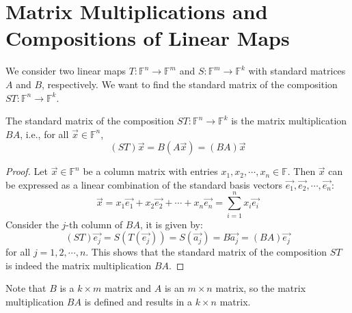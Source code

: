 \documentclass[
	11pt, %
	fleqn, %
	a4paper, %
]{LegrandOrangeBook}
\newcommand{\F}{\mathbb{F}} %
\begin{document}
\newpage

\section{Matrix Multiplications and Compositions of Linear Maps}

We consider two linear maps $T: \F^n \to \F^m$ and $S: \F^m \to \F^k$ with standard matrices $A$ and $B$, respectively. We want to find the standard matrix of the composition $ST: \F^n \to \F^k$.

\begin{center}
\end{center}

\begin{proposition}
    The standard matrix of the composition $ST: \F^n \to \F^k$ is the matrix multiplication $BA$, i.e., for all $\vec{x} \in \F^n$,
    \[
        (ST)\vec{x} = B(A\vec{x}) = (BA)\vec{x}
    \]
\end{proposition}

\begin{proof}
    Let $\vec{x} \in \F^n$ be a column matrix with entries $x_1, x_2, \cdots, x_n \in \F$. Then $\vec{x}$ can be expressed as a linear combination of the standard basis vectors $\vec{e_1}, \vec{e_2}, \cdots, \vec{e_n}$:
    \[
        \vec{x} = x_1 \vec{e_1} + x_2 \vec{e_2} + \cdots + x_n \vec{e_n} = \sum_{i=1}^{n} x_i \vec{e_i}
    \]
    Consider the $j$-th column of $BA$, it is given by:
    \[
        (ST)\vec{e_j} = S(T(\vec{e_j})) = S(\vec{a_j}) = B\vec{a_j} = (BA)\vec{e_j}
    \]
    for all $j = 1, 2, \cdots, n$. This shows that the standard matrix of the composition $ST$ is indeed the matrix multiplication $BA$.
\end{proof}

\begin{remark}
    Note that $B$ is a $k \times m$ matrix and $A$ is an $m \times n$ matrix, so the matrix multiplication $BA$ is defined and results in a $k \times n$ matrix.
\end{remark}
\end{document}
